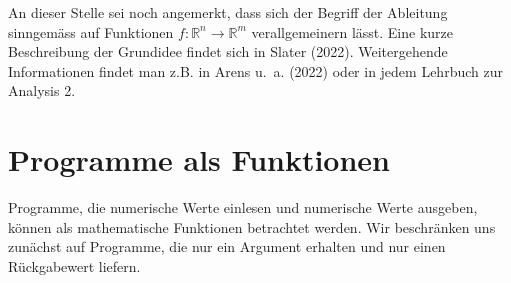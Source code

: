 \documentclass[
  letterpaper,
  DIV=11,
  oneside]{scrreprt}
\theoremstyle{definition}
\theoremstyle{definition}
\theoremstyle{remark}
\begin{document}
An dieser Stelle sei noch angemerkt, dass sich der Begriff der Ableitung
sinngemäss auf Funktionen \(f: \mathbb{R}^n \rightarrow\mathbb{R}^m\)
verallgemeinern lässt. Eine kurze Beschreibung der Grundidee findet sich
in Slater (2022). Weitergehende Informationen findet man z.B. in Arens
u.~a. (2022) oder in jedem Lehrbuch zur Analysis 2.

\hypertarget{sec-ProgFunc}{%
\section{Programme als Funktionen}\label{sec-ProgFunc}}

Programme, die numerische Werte einlesen und numerische Werte ausgeben,
können als mathematische Funktionen betrachtet werden. Wir beschränken
uns zunächst auf Programme, die nur ein Argument erhalten und nur einen
Rückgabewert liefern.
\end{document}
